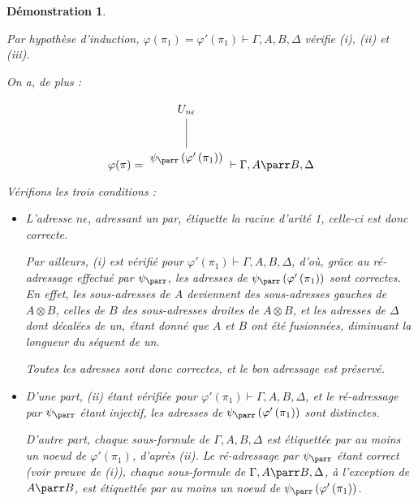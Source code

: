 \documentclass[11pt,a4paper]{article}
\newtheorem{demonstration}{Démonstration}
\newcommand*{\tensor}{\otimes}
\newcommand*{\someproof}{\pi}
\newcommand*{\encode}{\ensuremath{\varphi}}
\begin{document}
\begin{demonstration}
\begin{itemize}
    Par hypothèse d'induction, $\encode \left( \pi_1 \right) = \encode ' \left( \pi_1 \right) \vdash \Gamma, A, B, \Delta$ vérifie (i), (ii) et (iii).
    
    On a, de plus :

    \begin{equation*}
    \encode ( \someproof ) = \begin{tikzpicture}%
    [level distance=1.5cm,
    level 2/.style={sibling distance=3.5cm}]
    \node {$U_{n \epsilon}$}
        child {node {$\psi_\parr \left( \encode' \left( \pi_1 \right) \right)$}
    };
    \end{tikzpicture} \vdash \Gamma, A \parr B, \Delta
    \end{equation*}

    Vérifions les trois conditions :
    \begin{itemize}
        \item[(i) :]{L'adresse $n \epsilon$, adressant un par, étiquette la racine d'arité 1, celle-ci est donc correcte.
        
        Par ailleurs, (i) est vérifié pour $\encode ' \left( \pi_1 \right) \vdash \Gamma, A, B, \Delta$, d'où, grâce au ré-adressage effectué par $\psi_\parr$, les adresses de $\psi_\parr \left( \encode' \left( \pi_1 \right) \right)$ sont correctes. En effet, les sous-adresses de $A$ deviennent des sous-adresses gauches de $A \tensor B$, celles de $B$ des sous-adresses droites de $A \tensor B$, et les adresses de $\Delta$ dont décalées de un, étant donné que $A$ et $B$ ont été fusionnées, diminuant la longueur du séquent de un.
        
        Toutes les adresses sont donc correctes, et le bon adressage est préservé.
        }
        
        \item[(ii) :] D'une part, (ii) étant vérifiée pour $\encode ' \left( \pi_1 \right) \vdash \Gamma, A, B, \Delta$, et le ré-adressage par $\psi_\parr$ étant injectif, les adresses de $\psi_\parr \left( \encode' \left( \pi_1 \right) \right)$ sont distinctes.
        
        D'autre part, chaque sous-formule de $\Gamma, A, B, \Delta$ est étiquettée par au moins un noeud de $\encode ' \left( \pi_1 \right)$, d'après (ii). Le ré-adressage par $\psi_\parr$ étant correct (voir preuve de (i)), chaque sous-formule de $\Gamma, A \parr B, \Delta$, à l'exception de $A \parr B$, est étiquettée par au moins un noeud de $\psi_\parr \left( \encode' \left( \pi_1 \right) \right)$.
        

\end{itemize}
\end{itemize}
\end{demonstration}
\end{document}
